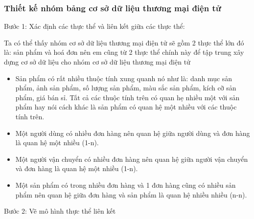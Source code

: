 \subsubsection{Thiết kế nhóm bảng cơ sở dữ liệu thương mại điện tử}
Bước 1: Xác định các thực thể và liên kết giữa các thực thể:
\par 
Ta có thể thấy nhóm cơ sở dữ liệu thương mại điện tử sẽ gồm 2 thực thể lớn đó là: sản phẩm và hoá đơn nên em cũng từ 2 thực thể chính này để tập trung xây dựng cơ sở dữ liệu cho nhóm cơ sở dữ liệu thương mại điện tử
\begin{itemize}
\item Sản phẩm có rất nhiều thuộc tính xung quanh nó như là: danh mục sản phẩm, ảnh sản phẩm, số lượng sản phẩm, màu sắc sản phẩm, kích cỡ sản phẩm, giá bán sỉ. Tất cả các thuộc tính trên có quan hẹ nhiều một với sản phẩm hay nói cách khác là sản phẩm có quan hệ một nhiều với các thuộc tính trên.
\item Một người dùng có nhiều đơn hàng nên quan hệ giữa người dùng và đơn hàng là quan hệ một nhiều (1-n).
\item Một người vận chuyển có nhiều đơn hàng nên quan hệ giữa người vận chuyển và đơn hàng là quan hệ một nhiều (1-n).
\item Một sản phẩm có trong nhiều đơn hàng và 1 đơn hàng cũng có nhiều sản phẩm nên quan hệ giữa đơn hàng và sản phẩm là quan hệ nhiều nhiều (n-n). 
\end{itemize}
Bước 2: Vẽ mô hình thực thể liên kết

